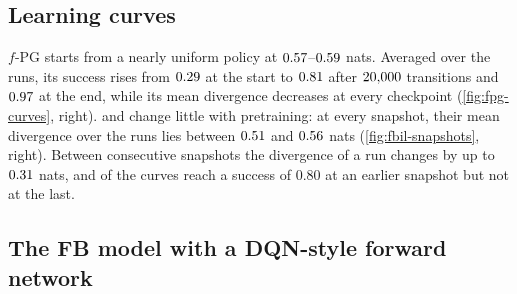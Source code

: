 \subsection{Learning curves}

$f$-PG starts from a nearly uniform policy at $\vn{s12.fpg.js0.lo}{0.57}$--$\vn{s12.fpg.js0.hi}{0.59}$ nats. Averaged over the  runs, its success rises from $\vn{s12.fpg.succ0}{0.29}$ at the start to $\vn{s12.fpg.succ20k}{0.81}$ after $\vn{s12.fpg.x20k}{20{,}000}$ transitions and $\vn{s12.fpg.succ_end}{0.97}$ at the end, while its mean divergence decreases at every checkpoint (\cref{fig:fpg-curves}, right).
\ERFB{} and \DMFB{} change little with pretraining: at every snapshot, their mean divergence over the  runs lies between $\vn{s12.fbil.snapmean.lo}{0.51}$ and $\vn{s12.fbil.snapmean.hi}{0.56}$ nats (\cref{fig:fbil-snapshots}, right). Between consecutive snapshots the divergence of a run changes by up to $\vn{s12.swing}{0.31}$ nats, and  of the  curves reach a success of $0.80$ at an earlier snapshot but not at the last.

\subsection{The FB model with a DQN-style forward network}

